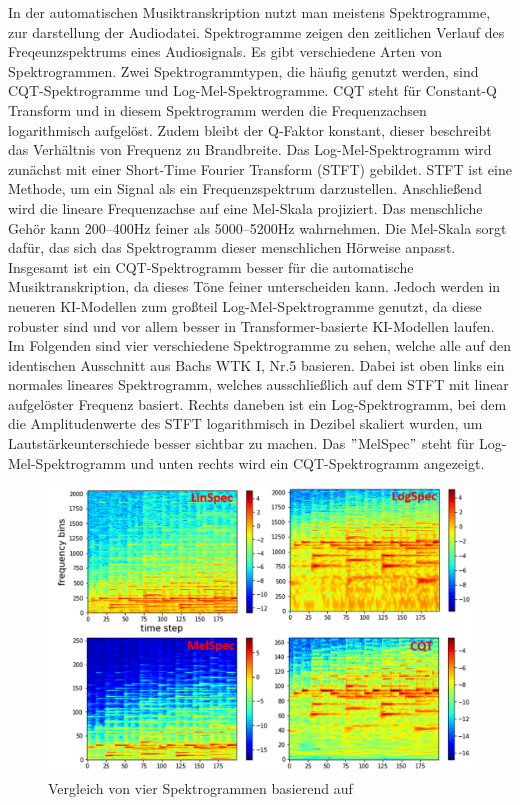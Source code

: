 In der automatischen Musiktranskription nutzt man meistens Spektrogramme, zur darstellung der Audiodatei.
Spektrogramme zeigen den zeitlichen Verlauf des Freqeunzspektrums eines Audiosignals.
Es gibt verschiedene Arten von Spektrogrammen.
Zwei Spektrogrammtypen, die häufig genutzt werden, sind CQT-Spektrogramme und Log-Mel-Spektrogramme.
CQT steht für Constant-Q Transform und in diesem Spektrogramm werden die Frequenzachsen logarithmisch aufgelöst.
Zudem bleibt der Q-Faktor konstant, dieser beschreibt das Verhältnis von Frequenz zu Brandbreite.
Das Log-Mel-Spektrogramm wird zunächst mit einer Short-Time Fourier Transform (STFT) gebildet.
STFT ist eine Methode, um ein Signal als ein Frequenzspektrum darzustellen.
Anschließend wird die lineare Frequenzachse auf eine Mel-Skala projiziert.
Das menschliche Gehör kann 200--400Hz feiner als 5000--5200Hz wahrnehmen.
Die Mel-Skala sorgt dafür, das sich das Spektrogramm dieser menschlichen Hörweise anpasst.
Insgesamt ist ein CQT-Spektrogramm besser für die automatische Musiktranskription,
da dieses Töne feiner unterscheiden kann.
Jedoch werden in neueren KI-Modellen zum großteil Log-Mel-Spektrogramme genutzt,
da diese robuster sind und vor allem besser in Transformer-basierte KI-Modellen laufen.
Im Folgenden sind vier verschiedene Spektrogramme zu sehen,
welche alle auf den identischen Ausschnitt aus Bachs WTK I, Nr.5 basieren.
Dabei ist oben links ein normales lineares Spektrogramm,
welches ausschließlich auf dem STFT mit linear aufgelöster Frequenz basiert.
Rechts daneben ist ein Log-Spektrogramm,
bei dem die Amplitudenwerte des STFT logarithmisch in Dezibel skaliert wurden,
um Lautstärkeunterschiede besser sichtbar zu machen.
Das \("\)MelSpec\("\) steht für Log-Mel-Spektrogramm und unten rechts wird ein CQT-Spektrogramm angezeigt.
\begin{figure}[H]
    \centering
    \includegraphics[width=1\textwidth]{Graphics/different_spectrograms}
    \caption{Vergleich von vier Spektrogrammen basierend auf \cite{cheuk2020impact}}
    \label{fig:different_specs}
\end{figure}

